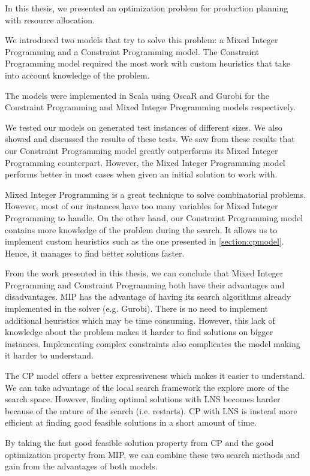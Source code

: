 \documentclass[../thesis.tex]{subfiles}
\begin{document}
In this thesis, we presented an optimization problem for production planning 
with resource allocation.

We introduced two models that try to solve
this problem: a Mixed Integer Programming and a Constraint Programming model.
The Constraint Programming model required the most work with custom heuristics that take into account knowledge of the problem.

The models were implemented in Scala using OscaR and Gurobi for the Constraint Programming and Mixed Integer Programming models respectively.

We tested our models on generated test instances of different sizes.
We also showed and discussed the results of these tests. We saw from these results that our Constraint Programming model greatly outperforms
its Mixed Integer Programming counterpart.
However, the Mixed Integer Programming model performs better in most cases when given an initial solution 
to work with.


Mixed Integer Programming is a great technique to solve combinatorial problems. However, most of our 
instances have too many variables for Mixed Integer Programming to handle.
On the other hand,
our Constraint Programming model contains more knowledge of the problem during the search. 
It allows us to implement custom heuristics such as the one presented in \autoref{section:cpmodel}. Hence, it manages to find 
better solutions faster. 

From the work presented in this thesis, we can conclude that Mixed Integer Programming and Constraint Programming both have their advantages and disadvantages.
MIP has the advantage of having its search algorithms already implemented in the solver (e.g. Gurobi). There is no need 
to implement additional heuristics which may be time consuming. However, this lack of knowledge about the problem makes 
it harder to find solutions on bigger instances. Implementing complex constraints also complicates the model making it harder to understand. 

The CP model offers a better expressiveness which makes it easier to understand. We can take advantage of the local search 
framework the explore more of the search space. However, finding optimal solutions with LNS becomes harder because of 
the nature of the search (i.e. restarts). CP with LNS is instead more efficient at finding good feasible solutions in a 
short amount of time.

By taking the fast good feasible solution property from CP and the good optimization property from MIP, we can combine these two 
search methods and gain from the advantages of both models.
\end{document}
